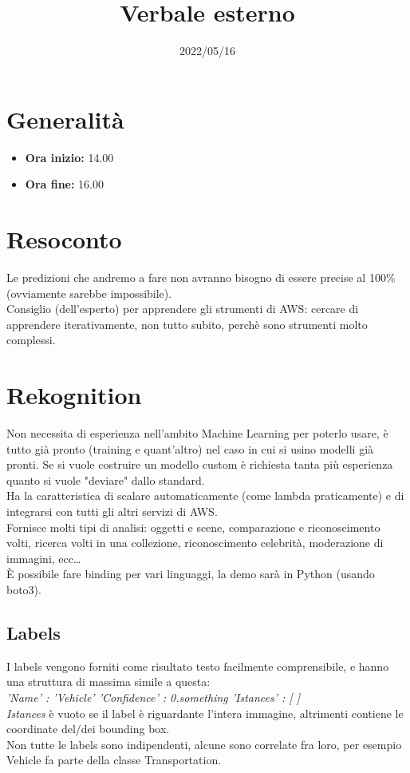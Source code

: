 \documentclass{classes/base}
\title{Verbale esterno}
\date{2022/05/16}
\author{\marcob}
\renewcommand{\maketitle}{
    
}
\begin{document}
    \maketitle

    \section*{Generalità}
    \begin{itemize}
        \item \textbf{Ora inizio:} 14.00
        \item \textbf{Ora fine:} 16.00
    \end{itemize}

    \section*{Resoconto}
    Le predizioni che andremo a fare non avranno bisogno di essere precise al 100\% (ovviamente sarebbe impossibile).\\
    Consiglio (dell’esperto) per apprendere gli strumenti di AWS: cercare di apprendere iterativamente, non tutto subito, perchè sono strumenti molto complessi.\\

    \section*{Rekognition}
    Non necessita di esperienza nell’ambito Machine Learning per poterlo usare, è tutto già pronto (training e quant’altro) nel caso in cui si usino modelli già pronti.
    Se si vuole costruire un modello custom è richiesta tanta più esperienza quanto si vuole "deviare" dallo standard.\\
    Ha la caratteristica di scalare automaticamente (come lambda praticamente) e di integrarsi con tutti gli altri servizi di AWS.\\
    Fornisce molti tipi di analisi: oggetti e scene, comparazione e riconoscimento volti, ricerca volti in una collezione, riconoscimento celebrità, moderazione di immagini, ecc… \\
    È possibile fare binding per vari linguaggi, la demo sarà in Python (usando boto3).

    \subsection*{Labels}
    I labels vengono forniti come risultato testo facilmente comprensibile, e hanno una struttura di massima simile a questa: \\
    \textit{'Name' : 'Vehicle' 
    'Confidence' : 0.something 
    'Istances' : [ ]}  
    \\
    \textit{Istances} è vuoto se il label è
                        riguardante l'intera immagine, altrimenti 
                        contiene le coordinate del/dei bounding box.\\
    Non tutte le labels sono indipendenti, alcune sono correlate fra loro, per esempio Vehicle fa parte della classe Transportation.
\end{document}
